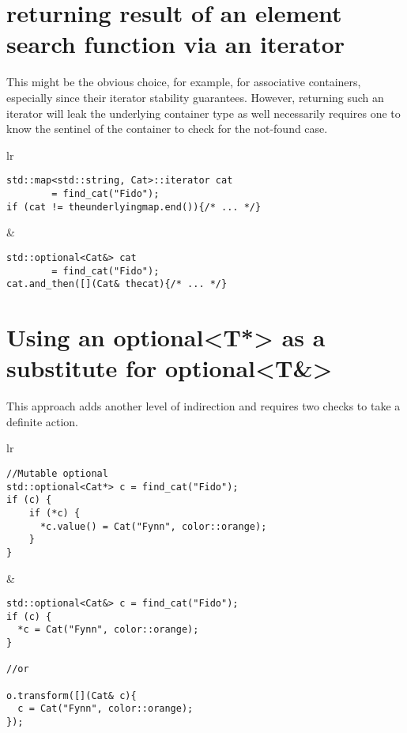 \documentclass[a4paper,10pt,oneside,openany,final,article]{memoir}
\begin{document}
  \section{returning result of an element search function via an iterator}

  This might be the obvious choice, for example, for associative containers, especially since their iterator stability guarantees.
  However, returning such an iterator will leak the underlying container type as well necessarily requires one to know the sentinel of the container to check for the not-found case.

  \begin{tabular}{ lr }
  \begin{minipage}[t]{0.45\columnwidth}
    \begin{verbatim}
std::map<std::string, Cat>::iterator cat
        = find_cat("Fido");
if (cat != theunderlyingmap.end()){/* ... */}

    \end{verbatim}
  \end{minipage}
  &
    \begin{minipage}[t]{0.45\columnwidth}
      \begin{verbatim}
std::optional<Cat&> cat
        = find_cat("Fido");
cat.and_then([](Cat& thecat){/* ... */}

      \end{verbatim}
    \end{minipage}
  \end{tabular}

  \section{Using an optional<T*> as a substitute for optional<T\&>}

This approach adds another level of indirection and requires two checks to take a definite action.

  \begin{tabular}{ lr }
  \begin{minipage}[t]{0.45\columnwidth}
    \begin{verbatim}
//Mutable optional
std::optional<Cat*> c = find_cat("Fido");
if (c) {
    if (*c) {
      *c.value() = Cat("Fynn", color::orange);
    }
}

    \end{verbatim}
  \end{minipage}
  &
    \begin{minipage}[t]{0.45\columnwidth}
      \begin{verbatim}
std::optional<Cat&> c = find_cat("Fido");
if (c) {
  *c = Cat("Fynn", color::orange);
}

//or

o.transform([](Cat& c){
  c = Cat("Fynn", color::orange);
});
        \end{verbatim}
      \end{minipage}
\end{tabular}
\end{document}
